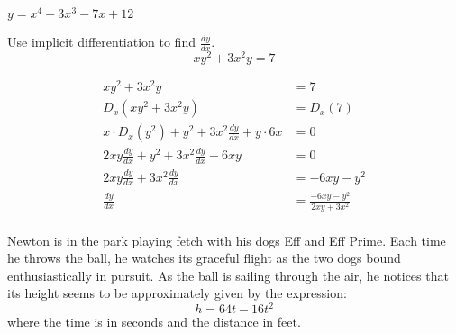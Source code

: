 \documentclass[fleqn,addpoints]{exam}
\begin{document}
\begin{questions}
\begin{solution}[8 cm]
\end{solution}

\ifprintanswers
\pagebreak
\fi


\question $y = x^4 + 3x^3 - 7x + 12$


\ifprintanswers
\else
\pagebreak
\fi

\question[10] Use implicit differentiation to find $\frac{dy}{dx}$.
\[
  xy^2 + 3x^2y = 7
\]
\begin{solution}[5 cm]
\begin{align*}
  xy^2 + 3x^2y &= 7 \\
  D_x(xy^2 + 3x^2y) &= D_x(7) \\
  x \cdot D_x(y^2) + y^2 + 3x^2 \frac{dy}{dx} + y \cdot 6x &= 0 \\
  2xy \frac{dy}{dx} + y^2 + 3x^2 \frac{dy}{dx} + 6xy &= 0 \\
  2xy \frac{dy}{dx} + 3x^2 \frac{dy}{dx} &= -6xy - y^2 \\
  \frac{dy}{dx} &= \frac{-6xy - y^2}{2xy + 3x^2} \\
\end{align*}
\end{solution}

\pagebreak


\question 
Newton is in the park playing fetch with his dogs Eff and Eff Prime.  Each time he throws the ball, he watches its
graceful flight as the two dogs bound enthusiastically in pursuit.  As the ball is sailing through the air, he
notices that its height seems to be approximately given by the expression:
\[
  h = 64t - 16t^2 
\]
where the time is in seconds and the distance in feet.


\end{questions}
\end{document}
